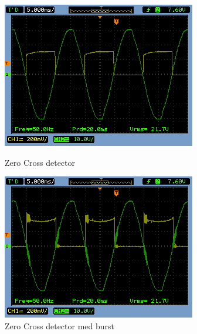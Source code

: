 \begin{figure}[htb]
  \begin{minipage}{0.45\textwidth}
    \centering
      \includegraphics[width=\textwidth]{billeder/HWTest/Encoder/Encoder_zerocross}
      \caption{Zero Cross detector}
    \label{fig:ZC_UB}
  \end{minipage}
  \hspace{0.1\textwidth}
  \begin{minipage}{0.45\textwidth}
    \centering
      \includegraphics[width=\textwidth]{billeder/HWTest/Encoder/Encoder_zerocross_burst}
      \caption{Zero Cross detector med burst}
    \label{fig:ZC_MB}
  \end{minipage}
\end{figure}


